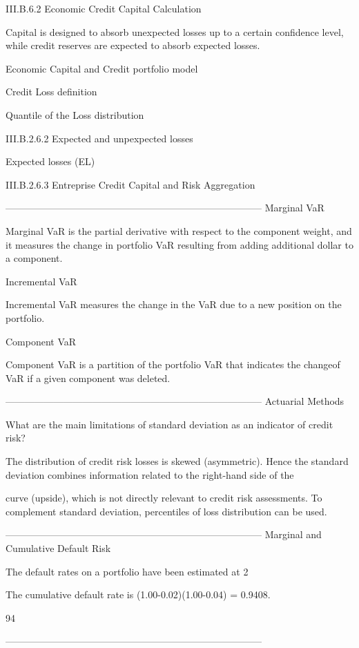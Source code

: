   

 

 

III.B.6.2 Economic Credit Capital Calculation


Capital is designed to absorb unexpected losses up to a certain confidence level, while credit reserves are expected to absorb expected losses.

 

Economic Capital and Credit portfolio model

 

Credit Loss definition

 

Quantile of the Loss distribution

III.B.2.6.2 Expected and unpexpected losses


Expected losses (EL)

 

III.B.2.6.3 Entreprise Credit Capital and Risk Aggregation



--------------------------------------------------------------------------------
Marginal VaR

Marginal VaR is the partial derivative with respect to the component weight, and it measures the change in portfolio VaR resulting from adding additional dollar to a component.

Incremental VaR

Incremental VaR measures the change in the VaR due to a new position on the portfolio.

Component VaR

Component VaR is a partition of the portfolio VaR that indicates the changeof VaR if a given component was deleted.

 


--------------------------------------------------------------------------------
Actuarial Methods


What are the main limitations of standard deviation as an indicator of credit risk?

The distribution of credit risk losses is skewed (asymmetric). Hence the standard deviation combines information related to the right-hand side of the

curve (upside), which is not directly relevant to credit risk assessments. To complement standard deviation, percentiles of loss distribution can be used.


--------------------------------------------------------------------------------
Marginal and Cumulative Default Risk

The default rates on a portfolio have been estimated at 2%


The cumulative default rate is (1.00-0.02)(1.00-0.04) = 0.9408.

 

94%




--------------------------------------------------------------------------------



